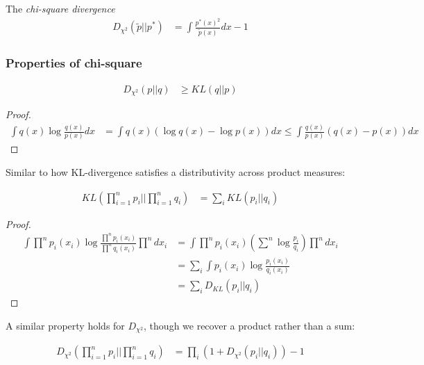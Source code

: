 \begin{definition}
  The \emph{chi-square divergence}
  \begin{align}
    D_{\chi^2}(\tilde{p} || p^*)
  &= \int \frac{p^*(x)^2}{\tilde{p}(x)} dx - 1
\end{align}
\end{definition}

\subsubsection{Properties of chi-square}

\begin{proposition}
  \begin{align}
    D_{\chi^2}(p||q) &\geq KL(q||p)
  \end{align}
\end{proposition}

\begin{proof}
  \begin{align}
    \int q(x) \log \frac{q(x)}{p(x)} dx
    &= \int q(x)\left( \log q(x) - \log p(x) \right) dx
    \leq \int \frac{q(x)}{p(x)} \left( q(x) - p(x) \right) dx
  \end{align}
\end{proof}

Similar to how KL-divergence satisfies a distributivity across
product measures:
\begin{proposition}[KL of products]
  \begin{align}
    KL\left( \prod_{i=1}^n p_i || \prod_{i=1}^n q_i\right)
  &= \sum_i KL(p_i || q_i)
  \end{align}
\end{proposition}

\begin{proof}
  \begin{align}
    \int \prod^n p_i(x_i) \log \frac{\prod^n p_i(x_i)}{\prod^n q_i(x_i)} \prod^n dx_i
    &= \int \prod^n p_i(x_i) \left(
      \sum^n \log \frac{p_i}{q_i}
    \right) \prod^n dx_i \\
    &= \sum_i \int p_i(x_i) \log \frac{p_i(x_i)}{q_i(x_i)} \\
    &= \sum_i D_{KL}(p_i || q_i)
  \end{align}
\end{proof}

A similar property holds for $D_{\chi^2}$, though we recover
a product rather than a sum:
\begin{proposition}
  \begin{align}
    D_{\chi^2}\left( \prod_{i=1}^n p_i || \prod_{i=1}^n q_i\right)
    &= \prod_i (1 + D_{\chi^2}(p_i || q_i)) - 1
  \end{align}
\end{proposition}

